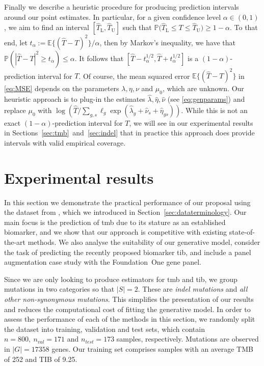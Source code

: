 \documentclass[12pt]{article}
\begin{document}
Finally we describe a heuristic procedure for producing prediction intervals around our point estimates.  In particular, for a given confidence level $\alpha \in (0,1)$, we aim to find an interval $[\hat{T}_{\mathrm{L}}, \hat{T}_{\mathrm{U}}]$ such that $\mathbb{P}\bigl(\hat{T}_{\mathrm{L}} \leq T \leq \hat{T}_{\mathrm{U}}\bigr) \geq 1- \alpha.$  To that end, let $t_\alpha := \mathbb{E}\{(\hat{T} - T)^2\}/\alpha$, then by Markov's inequality, we have that $\mathbb{P}(|\hat{T} - T|^2 \geq t_\alpha) \leq \alpha$. It follows that $[\hat{T} - t_\alpha^{1/2} , \hat{T}+ t_\alpha^{1/2}]$ is a $(1-\alpha)$-prediction interval for $T$. Of course, the mean squared error $\mathbb{E}\{(\hat{T}-T)^2\}$ in \eqref{eq:MSE} depends on the parameters $\lambda, \eta, \nu$ and $\mu_0$, which are unknown.  Our heuristic approach is to plug-in the estimates $\hat{\lambda}, \hat{\eta}, \hat{\nu}$ (see \eqref{eq:genparams}) and replace $\mu_0$ with $\log(\hat{T}/\sum_{g,s}\ell_g\exp(\hat{\lambda}_g + \hat{\nu}_s + \hat{\eta}_{gs}))$. While this is not an exact $(1-\alpha)$-prediction interval for $T$,  we will see in our experimental results in Sections~\ref{sec:tmb}~and~\ref{sec:indel} that in practice this approach does provide intervals with valid empirical coverage.  

\section{Experimental results \label{sec:experimentalresults}}
In this section we demonstrate the practical performance of our proposal using the dataset from \citet{campbell_distinct_2016}, which we introduced in Section~\ref{sec:dataterminology}. Our main focus is the prediction of \acrshort{tmb} due to its stature as an established biomarker, and we show that our approach is competitive with existing state-of-the-art methods. We also analyse the suitability of our generative model, consider the task of predicting the recently proposed biomarker \acrshort{tib}, and include a panel augmentation case study with the Foundation~One gene panel.

Since we are only looking to produce estimators for \acrshort{tmb} and \acrshort{tib}, we group mutations in two categories so that $|S|=2$. These are \emph{indel mutations} and \emph{all other non-synonymous mutations}. This simplifies the presentation of our results and reduces the computational cost of fitting the generative model.  In order to assess the performance of each of the methods in this section, we randomly split the dataset into training, validation and test sets, which contain $n = 800, \ n_{val} = 171$ and $n_{test} = 173$ samples, respectively.  Mutations are observed in $|G| = 17358$ genes. Our training set comprises samples with an average TMB of 252 and TIB of 9.25. 
\end{document}
